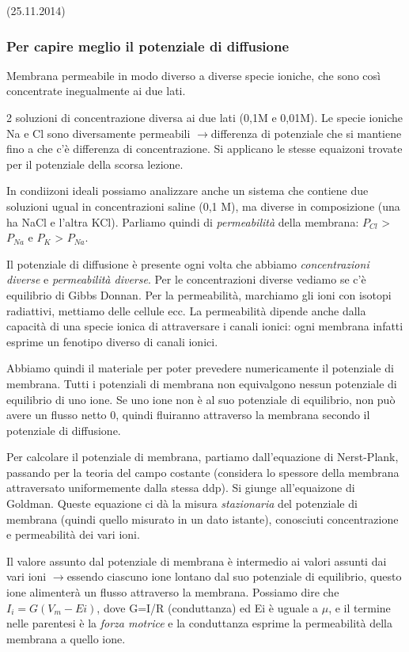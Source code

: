 \documentclass[a4paper,12pt]{article}
\newcommand{\lfreccia}{\ensuremath{\longrightarrow}}
\begin{document}
(25.11.2014)
\subsubsection{Per capire meglio il potenziale di diffusione}
Membrana permeabile in modo diverso a diverse specie ioniche, che sono così concentrate inegualmente ai due lati.

2 soluzioni di concentrazione diversa ai due lati (0,1M e 0,01M). Le specie ioniche Na e Cl sono diversamente permeabili \lfreccia differenza di potenziale che si mantiene fino a che c'è differenza di concentrazione. Si applicano le stesse equaizoni trovate per il potenziale della scorsa lezione.

In condiizoni ideali possiamo analizzare anche un sistema che contiene due soluzioni ugual in concentrazioni saline (0,1 M), ma diverse in composizione (una ha NaCl e l'altra KCl). Parliamo quindi di \emph{permeabilità} della membrana: $P_{Cl}$ > $P_{Na}$ e $P_{K}$ > $P_{Na}$.

Il potenziale di diffusione è presente ogni volta che abbiamo \emph{concentrazioni diverse} e \emph{permeabilità diverse}. Per le concentrazioni diverse vediamo se c'è equilibrio di Gibbs Donnan. Per la permeabilità, marchiamo gli ioni con isotopi radiattivi, mettiamo delle cellule ecc. La permeabilità dipende anche dalla capacità di una specie ionica di attraversare i canali ionici: ogni membrana infatti esprime un fenotipo diverso di canali ionici.

Abbiamo quindi il materiale per poter prevedere numericamente il potenziale di membrana. 
Tutti i potenziali di membrana non equivalgono nessun potenziale di equilibrio di uno ione. Se uno ione non è al suo potenziale di equilibrio, non può avere un flusso netto 0, quindi fluiranno attraverso la membrana secondo il potenziale di diffusione.

Per calcolare il potenziale di membrana, partiamo dall'equazione di Nerst-Plank, passando per la teoria del campo costante (considera lo spessore della membrana attraversato uniformemente dalla stessa ddp). Si giunge all'equaizone di Goldman. Queste equazione ci dà la misura \emph{stazionaria} del potenziale di membrana (quindi quello misurato in un dato istante), conosciuti concentrazione e permeabilità dei vari ioni.

Il valore assunto dal potenziale di membrana è intermedio ai valori assunti dai vari ioni \lfreccia essendo ciascuno ione lontano dal suo potenziale di equilibrio, questo ione alimenterà un flusso attraverso la membrana.
Possiamo dire che $I_{i}= G(V_{m} - Ei)$, dove G=I/R (conduttanza) ed Ei è uguale a $\mu$, e il termine nelle parentesi è la \emph{forza motrice} e la conduttanza esprime la permeabilità della membrana a quello ione.
\end{document}
